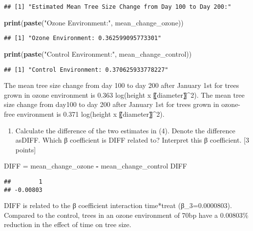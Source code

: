 \documentclass[
]{article}
\newenvironment{Shaded}{\begin{snugshade}}{\end{snugshade}}
\newcommand{\FunctionTok}[1]{\textcolor[rgb]{0.13,0.29,0.53}{\textbf{#1}}}
\newcommand{\NormalTok}[1]{#1}
\newcommand{\OtherTok}[1]{\textcolor[rgb]{0.56,0.35,0.01}{#1}}
\newcommand{\SpecialCharTok}[1]{\textcolor[rgb]{0.81,0.36,0.00}{\textbf{#1}}}
\newcommand{\StringTok}[1]{\textcolor[rgb]{0.31,0.60,0.02}{#1}}
\providecommand{\tightlist}{%
  \setlength{\itemsep}{0pt}\setlength{\parskip}{0pt}}
\begin{document}
\begin{verbatim}
## [1] "Estimated Mean Tree Size Change from Day 100 to Day 200:"
\end{verbatim}

\begin{Shaded}
\begin{Highlighting}[]
\FunctionTok{print}\NormalTok{(}\FunctionTok{paste}\NormalTok{(}\StringTok{"Ozone Environment:"}\NormalTok{, mean\_change\_ozone))}
\end{Highlighting}
\end{Shaded}

\begin{verbatim}
## [1] "Ozone Environment: 0.362599095773301"
\end{verbatim}

\begin{Shaded}
\begin{Highlighting}[]
\FunctionTok{print}\NormalTok{(}\FunctionTok{paste}\NormalTok{(}\StringTok{"Control Environment:"}\NormalTok{, mean\_change\_control))}
\end{Highlighting}
\end{Shaded}

\begin{verbatim}
## [1] "Control Environment: 0.370625933778227"
\end{verbatim}

The mean tree size change from day 100 to day 200 after January 1st for
trees grown in ozone environment is 0.363 log(height x
〖diameter〗\^{}2). The mean tree size change from day100 to day 200
after January 1st for trees grown in ozone-free environment is 0.371
log(height x 〖diameter〗\^{}2).

\begin{enumerate}
\def\labelenumi{\arabic{enumi}.}
\setcounter{enumi}{4}
\tightlist
\item
  Calculate the difference of the two estimates in (4). Denote the
  difference asDIFF. Which β coefficient is DIFF related to? Interpret
  this β coefficient. {[}3 points{]}
\end{enumerate}

\begin{Shaded}
\begin{Highlighting}[]
\NormalTok{DIFF }\OtherTok{=}\NormalTok{ mean\_change\_ozone }\SpecialCharTok{{-}}\NormalTok{ mean\_change\_control}
\NormalTok{DIFF}
\end{Highlighting}
\end{Shaded}

\begin{verbatim}
##        1 
## -0.00803
\end{verbatim}

DIFF is related to the β coefficient interaction time*treat
(β\_3=0.0000803). Compared to the control, trees in an ozone environment
of 70bp have a 0.00803\% reduction in the effect of time on tree size.
\end{document}
